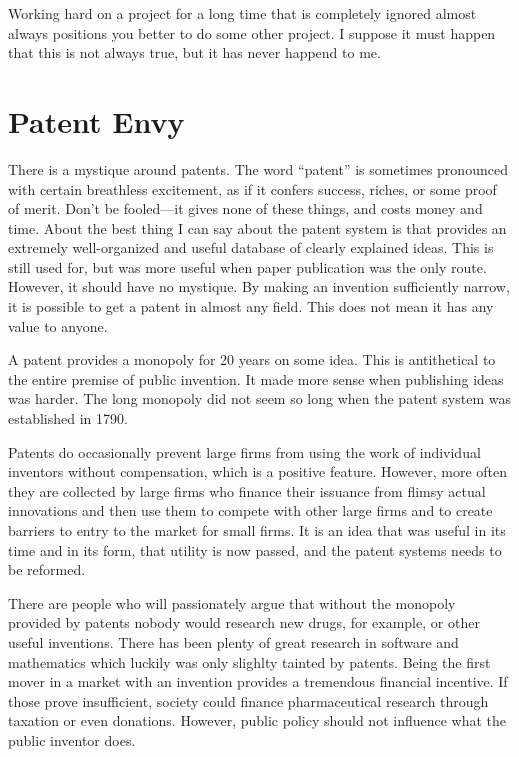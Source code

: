 \documentclass[
	fontsize=10pt, %
	twoside=false, %
	secnumdepth=1, %
]{kaobook}
\begin{document}
Working hard on a project for a long time that is completely ignored
almost always positions you better to do some other project.
I suppose it must happen that this is not always true,
but it has never happend to me.

\section{Patent Envy}

There is a mystique around patents.
The word ``patent'' is sometimes pronounced with certain
breathless excitement, as if it confers success, riches,
or some proof of merit.
Don't be fooled---it gives none of these things,
and costs money and time.
About the best thing I can say about the patent system
is that provides an extremely well-organized and useful
database of clearly explained ideas.
This is still used for, but was more useful
when paper publication was the only route.
However, it should have no mystique.
By making an invention sufficiently narrow, it
is possible to get a patent in almost any field.
This does not mean it has any value to anyone.


A patent provides a monopoly for 20 years on some idea.
This is antithetical to the entire premise of public invention.
It made more sense when publishing ideas was harder.
The long monopoly did not seem so long when the patent system
was established in 1790.

Patents do occasionally prevent large firms from using the
work of individual inventors without compensation, which
is a positive feature. However, more often they are collected
by large firms who finance their issuance from flimsy actual
innovations and then use them to compete with other large firms
and to create barriers to entry to the market for small firms.
It is an idea that was useful in its time and in its form,
that utility is now passed, and the patent systems needs
to be reformed.

There are people who will passionately argue that without
the monopoly provided by patents nobody would research new
drugs, for example, or other useful inventions.
There has been plenty of great research in software and
mathematics which luckily was only slighlty tainted by patents.
Being the first mover in a market with an invention provides
a tremendous financial incentive.
If those prove insufficient, society could finance
pharmaceutical research through taxation or
even donations.
However, public policy should not influence
what the public inventor does.
\end{document}
